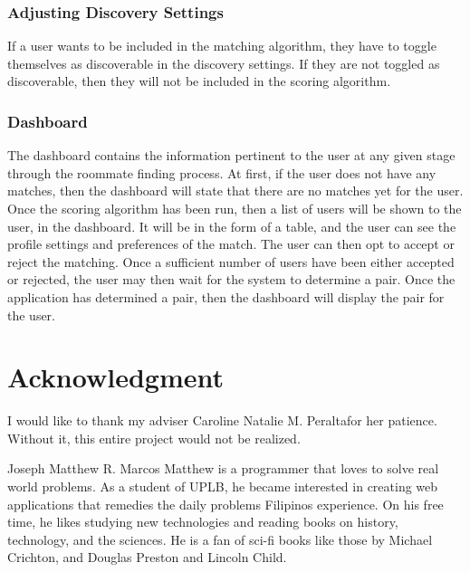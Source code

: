 \documentclass[journal]{./IEEE/IEEEtran}
\newcommand{\ADVISEE}{Joseph Matthew R. Marcos}
\newcommand{\ADVISER}{Caroline Natalie M. Peralta}
\begin{document}
        \subsubsection{Adjusting Discovery Settings}
        If a user wants to be included in the matching algorithm, they have to toggle themselves as discoverable in the
        discovery settings. If they are not toggled as discoverable, then they will not be included in the scoring
        algorithm.

        \subsubsection{Dashboard}
        The dashboard contains the information pertinent to the user at any given stage through the roommate finding
        process. At first, if the user does not have any matches, then the dashboard will state that there are no
        matches yet for the user. Once the scoring algorithm has been run, then a list of users will be shown to the
        user, in the dashboard. It will be in the form of a table, and the user can see the profile settings and
        preferences of the match. The user can then opt to accept or reject the matching. Once a sufficient number of
        users have been either accepted or rejected, the user may then wait for the system to determine a pair. Once the
        application has determined a pair, then the dashboard will display the pair for the user.

\newpage
\section*{Acknowledgment}
I would like to thank my adviser \ADVISER for her patience. Without it, this entire project would not be realized.
\begin{biography}{\ADVISEE}
    Matthew is a programmer that loves to solve real world problems. As a student of UPLB, he became interested in creating
    web applications that remedies the daily problems Filipinos experience. On his free time, he likes studying new
    technologies and reading books on history, technology, and the sciences. He is a fan of sci-fi books like those by
    Michael Crichton, and Douglas Preston and Lincoln Child.
\end{biography}
\end{document}
